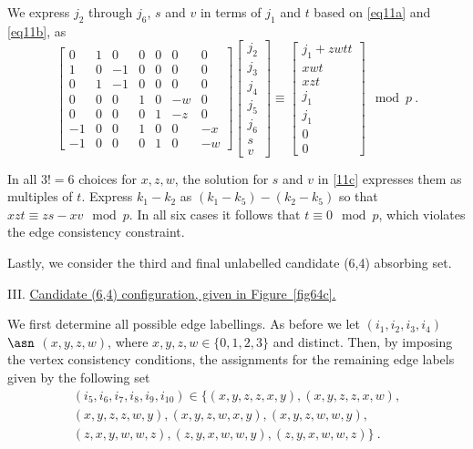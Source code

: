 {We express $j_2$ through $j_6$, $s$ and $v$ in terms of $j_1$ and
$t$ based on \ref{eq11a} and \ref{eq11b}, as
\begin{equation}\label{11c}
\left[ \begin{array}{ccccccc} 0 & 1 & 0 & 0 & 0 & 0 &0\\
1 & 0 & -1 & 0 & 0 & 0 &0\\
0 & 1 & -1 & 0 & 0 & 0 &0\\
0 & 0 & 0 & 1 & 0 & -w &0\\
0 & 0 & 0 & 0 & 1 & -z &0\\
-1 & 0 & 0 & 1 & 0 & 0 &-x\\
-1 & 0 & 0 & 0 & 1 & 0 &-w
\end{array}\right] \left[\begin{array}{c}
j_2\\j_3\\j_4\\j_5\\j_6\\s\\v\end{array}\right] \equiv
\left[\begin{array}{c}j_1+zwtt\\xwt\\xzt\\j_1\\j_1\\0\\0\end{array}\right]
\mod p~.
\end{equation}

In all $3!=6$ choices for $x,z,w$, the solution for $s$ and $v$ in
\ref{11c} expresses them as multiples of $t$. Express $k_1-k_2$ as
$(k_1-k_5)-(k_2-k_5)$ so that $xzt \equiv zs-xv \mod p$. In all
six cases it follows that $t \equiv 0 \mod p$, which violates the
edge consistency constraint.

Lastly, we consider the third and final unlabelled candidate (6,4)
absorbing set.

III. \underline{Candidate (6,4) configuration, given in
 Figure~\ref{fig64c}.}

 We first determine all possible edge labellings. As before we let
$(i_1,i_2,i_3,i_4)$ $\asn$ $(x,y,z,w)$, where $x,y,z,w \in
\{0,1,2,3 \}$ and distinct. Then, by imposing the vertex
consistency conditions, the assignments for the remaining edge
labels given by the following set
\begin{eqnarray*}\label{tuples3} (i_5,i_6,i_7,i_8,i_9,i_{10}) \in
 \{(x,y,z,z,x,y),(x,y,z,z,x,w),\\(x,y,z,z,w,y),(x,y,z,w,x,y),(x,y,z,w,w,y),\\(z,x,y,w,w,z), (z,y,x,w,w,y),(z,y,x,w,w,z)\}~.
\end{eqnarray*}

}
